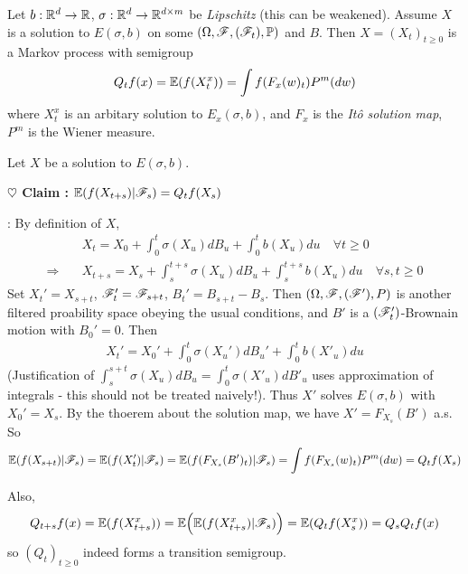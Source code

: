 \documentclass[12pt,a4paper]{article}
\newenvironment{proof}
{\begin{changemargin}{0.5cm}{0.5cm} 
	}%
	{\end{changemargin}
}
\newenvironment{subproof}
{\begin{changemargin}{0.5cm}{0.5cm} 
	}%
	{\end{changemargin}
}
\newenvironment{p}
{\begin{proof} 
	}%
	{\end{proof}
}
\begin{document}
\thm Let $b: \mathbb{R}^d \rightarrow \mathbb{R}$, $\sigma : \mathbb{R}^d \rightarrow \mathbb{R}^{d\times m}$ be \emph{Lipschitz} (this can be weakened). Assume $X$ is a solution to $E(\sigma, b)$ on some $(\Omega, \mathscr{F}, (\mathscr{F}_t), \mathbb{P})$ and $B$. Then $X= (X_t)_{t\geq 0}$ is a Markov process with semigroup
\begin{align*}
Q_t f(x) = \mathbb{E} (f(X_t^x)) = \int f(F_x(w)_t) P^m(dw)
\end{align*}
where $X_t^x$ is an arbitary solution to $E_x(\sigma,b)$, and $F_x$ is the \emph{It\^o solution map}, $P^m$ is the Wiener measure.
\begin{p}
\pf Let $X$ be a solution to $E(\sigma, b)$.

\textbf{$\heartsuit$ Claim :} $\mathbb{E}(f(X_{t+s})|\mathscr{F}_s) = Q_t f(X_s)$
\begin{subproof}
: By definition of $X$,
\begin{align*}
& X_t = X_0 + \int_0^t \sigma(X_u) dB_u + \int_0^t b(X_u) du \quad \forall t\geq 0 \\
\Rightarrow \quad & X_{t+s} = X_s + \int_s^{t+s} \sigma (X_u) dB_u + \int_s^{t+s} b(X_u) du \quad \forall s,t\geq 0
\end{align*}
Set $X_t' = X_{s+t}$, $\mathscr{F}_t' = \mathscr{F}_{s+t}$, $B_t' = B_{s+t} - B_s$. Then $(\Omega, \mathscr{F}, (\mathscr{F}'), P)$ is another filtered proability space obeying the usual conditions, and $B'$ is a $(\mathscr{F}'_t)$-Brownain motion with $B_0' =0$. Then
\begin{align*}
X_t' = X_0' + \int_0^t \sigma(X_u') dB_u' + \int_0^t b(X'_u) du 
\end{align*}
(Justification of $\int_s^{s+t} \sigma(X_u) dB_u = \int_0^t \sigma(X'_u)dB'_u$ uses approximation of integrals - this should not be treated naively!). Thus $X'$ solves $E(\sigma, b)$ with $X_0' = X_s$. By the thoerem about the solution map, we have $X' = F_{X_s} (B')$ a.s. So
\begin{align*}
\mathbb{E}(f(X_{s+t})|\mathscr{F}_s) = \mathbb{E}(f(X_t') | \mathscr{F}_s) = \mathbb{E}(f(F_{X_s}(B')_t) |\mathscr{F}_s) = \int f(F_{X_s}(w)_t) P^m(dw) = Q_t f(X_s)
\end{align*}
\end{subproof}
Also, 
\begin{align*}
Q_{t+s} f(x) = \mathbb{E} (f(X_{t+s}^x)) = \mathbb{E}\Big( \mathbb{E}(f(X_{t+s}^x) | \mathscr{F}_s) \Big) = \mathbb{E} (Q_t f(X_s^x)) = Q_s Q_t f(x)
\end{align*}
so $(Q_t)_{t\geq 0}$ indeed forms a transition semigroup.

\eop
\end{p}
\s
\end{document}
